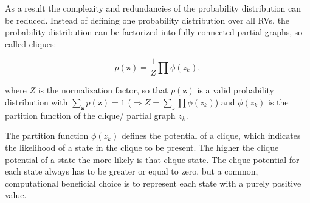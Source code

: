 As a result the complexity and redundancies of the probability distribution can be reduced. Instead of defining one probability distribution over all RVs, the probability distribution can be factorized into fully connected partial graphs, so-called cliques:

\[
p(\textbf{z}) = \frac{1}{Z} \prod \phi (z_k)  ,
\]

where $Z$ is the normalization factor, so that $p(\textbf{z})$ is a valid probability distribution with $\sum_{\textbf{z}} p(\textbf{z}) = 1$ ($ \Rightarrow Z = \sum_z \prod \phi (z_k) $) and $\phi (z_k)$ is the partition function of the clique/ partial graph $z_k$.

The partition function $\phi (z_k)$ defines the potential of a clique, which indicates the likelihood of a state in the clique to be present.
The higher the clique potential of a state the more likely is that clique-state.
The clique potential for each state always has to be greater or equal to zero, but a common, computational beneficial choice is to represent each state with a purely positive value.

